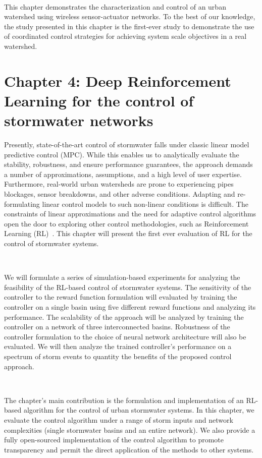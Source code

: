 \

This chapter demonstrates the characterization and control of an urban watershed using wireless sensor-actuator networks. To the best of our knowledge, the study presented in this chapter is the first-ever study to demonstrate the use of coordinated control strategies for achieving system scale objectives in a real watershed.

\section{Chapter 4: Deep Reinforcement Learning for the control of stormwater networks}

Presently, state-of-the-art control of stormwater falls under classic linear model predictive control (MPC).
While this enables us to analytically evaluate the stability, robustness, and ensure performance guarantees, the approach demands a number of approximations, assumptions, and a high level of user expertise.
Furthermore, real-world urban watersheds are prone to experiencing pipes blockages, sensor breakdowns, and other adverse conditions.
Adapting and re-formulating linear control models to such non-linear conditions is difficult.
The constraints of linear approximations and the need for adaptive control algorithms open the door to exploring other control methodologies, such as Reinforcement Learning (RL)~\cite{Mnih2015}.
This chapter will present the first ever evaluation of RL for the control of stormwater systems.

\

We will formulate a series of simulation-based experiments for analyzing the feasibility of the RL-based control of stormwater systems.
The sensitivity of the controller to the reward function formulation will evaluated by training the controller on a single basin using five different reward functions and analyzing its performance.
The scalability of the approach will be analyzed by training the controller on a network of three interconnected basins.
Robustness of the controller formulation to the choice of neural network architecture will also be evaluated.
We will then analyze the trained controller's performance on a spectrum of storm events to quantity the benefits of the proposed control approach.

\

The chapter's main contribution is the formulation and implementation of an RL-based algorithm for the control of urban stormwater systems. In this chapter, we evaluate the control algorithm under a range of storm inputs and network complexities (single stormwater basins and an entire network). 
We also provide a fully open-sourced implementation of the control algorithm to promote transparency and permit the direct application of the methods to other systems.



